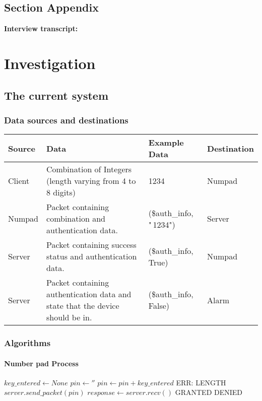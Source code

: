 \documentclass[12pt,a4paper]{report}
\begin{document}
\newpage
\subsection{Section Appendix}\label{section:_Toc370402495}
\textbf{Interview transcript:}


\section{Investigation}\label{section:_Toc370402496}
\subsection{The current system}\label{section:_Toc370402497}
\subsubsection{Data sources and destinations}\label{section:_Toc370402498}

\begin{table}[H]
\begin{tabular}{|l|p{4.5cm}|l|l|}
\hline
\textbf{Source} & \textbf{Data} & \textbf{Example Data} & \textbf{
Destination} \\
\hline
Client & Combination of Integers (length varying from 4 to 8 digits) & 
1234 & Numpad \\
\hline
Numpad & Packet containing combination and authentication data. & 
(\$auth\_info, "\,1234") & Server \\
\hline
Server & Packet containing success status and authentication data. & 
(\$auth\_info, True) & Numpad \\
\hline
Server & Packet containing authentication data and state that the device 
should be in. & (\$auth\_info, False) & Alarm \\
\hline
\end{tabular}
\end{table}
\newpage
\subsubsection{Algorithms}\label{section:_Toc370402499}
\paragraph{Number pad Process}

\begin{algorithmic}
	\STATE $key\_entered\gets None$
	\STATE $pin\gets  ''$
	    \STATE $pin\gets pin+key\_entered$
	\ENDWHILE
	    \PRINT ERR: LENGTH
    \ELSE
        \STATE $server.send\_packet(pin)$
        \STATE $response\gets server.recv()$
            \PRINT GRANTED
        \ELSE
            \PRINT DENIED
        \ENDIF
    \ENDIF
\ENDWHILE
\end{algorithmic}
\end{document}
